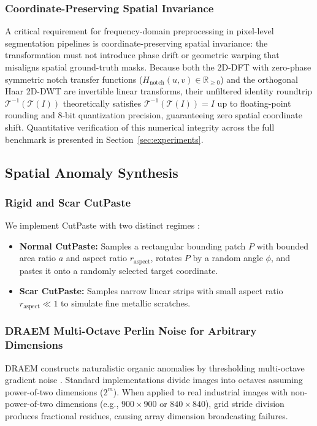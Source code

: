 \subsubsection{Coordinate-Preserving Spatial Invariance}
A critical requirement for frequency-domain preprocessing in pixel-level segmentation pipelines is coordinate-preserving spatial invariance: the transformation must not introduce phase drift or geometric warping that misaligns spatial ground-truth masks. Because both the 2D-DFT with zero-phase symmetric notch transfer functions ($H_{\text{notch}}(u, v) \in \mathbb{R}_{\ge 0}$) and the orthogonal Haar 2D-DWT are invertible linear transforms, their unfiltered identity roundtrip $\mathcal{T}^{-1}(\mathcal{T}(I))$ theoretically satisfies $\mathcal{T}^{-1}(\mathcal{T}(I)) = I$ up to floating-point rounding and 8-bit quantization precision, guaranteeing zero spatial coordinate shift. Quantitative verification of this numerical integrity across the full benchmark is presented in Section~\ref{sec:experiments}.

\subsection{Spatial Anomaly Synthesis}

\subsubsection{Rigid and Scar CutPaste}
We implement CutPaste with two distinct regimes \cite{li2021cutpaste}:
\begin{itemize}
    \item \textbf{Normal CutPaste:} Samples a rectangular bounding patch $P$ with bounded area ratio $a$ and aspect ratio $r_{\text{aspect}}$, rotates $P$ by a random angle $\phi$, and pastes it onto a randomly selected target coordinate.
    \item \textbf{Scar CutPaste:} Samples narrow linear strips with small aspect ratio $r_{\text{aspect}} \ll 1$ to simulate fine metallic scratches.
\end{itemize}

\subsubsection{DRAEM Multi-Octave Perlin Noise for Arbitrary Dimensions}
DRAEM constructs naturalistic organic anomalies by thresholding multi-octave gradient noise \cite{zavrtanik2021draem, perlin1985image}. Standard implementations divide images into octaves assuming power-of-two dimensions ($2^m$). When applied to real industrial images with non-power-of-two dimensions (e.g., $900 \times 900$ or $840 \times 840$), grid stride division produces fractional residues, causing array dimension broadcasting failures.

